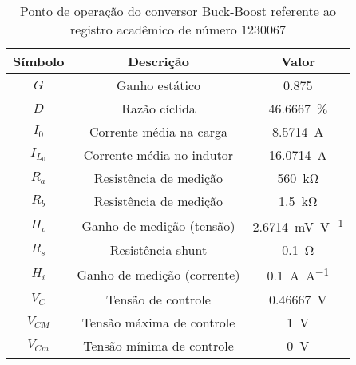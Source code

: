 \begin{table}[!ht]
\centering
\caption{Ponto de operação do conversor Buck-Boost referente ao registro acadêmico de número $1230067$}
\label{tab:steadystate}
\begin{tabular}{@{}ccc@{}}
\toprule
\textbf{Símbolo} & \textbf{Descrição} & \textbf{Valor}\\ \midrule
$G$ & Ganho estático & \SI{0.875}{}\\
$D$ & Razão cíclida  & \SI{46.6667}{\%}\\
$I_0$ & Corrente média na carga  & \SI{8.5714}{\A} \\
$I_{L_0}$ & Corrente média no indutor & \SI{16.0714}{\A} \\
$R_a$ & Resistência de medição & \SI{560}{\kilo\ohm} \\
$R_b$ & Resistência de medição & \SI{1.5}{\kilo\ohm} \\
$H_v$ & Ganho de medição (tensão) & \SI{2.6714}{\milli\V\per\V} \\
$R_s$ & Resistência shunt & \SI{0.1}{\ohm} \\
$H_i$ & Ganho de medição (corrente) & \SI{0.1}{\A\per\A} \\
$V_C$ & Tensão de controle  & \SI{0.46667}{\V} \\
$V_{CM}$ & Tensão máxima de controle  & \SI{1}{\V} \\
$V_{Cm}$ & Tensão mínima de controle  & \SI{0}{\V} \\
\bottomrule
\end{tabular}
\end{table}

